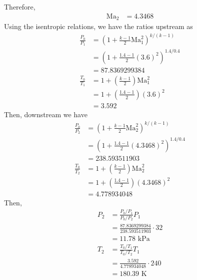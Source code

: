 Therefore,
\begin{align*}
    \text{Ma}_2 &= \boxed{4.3468}
\end{align*}
Using the isentropic relations, we have the ratios upstream as
\begin{align*}
    \frac{P_0}{P_1} &= \left(1 + \frac{k - 1}{2} \text{Ma}_1^2 \right)^{k/(k-1)} \\
    &= \left(1 + \frac{1.4 - 1}{2} (3.6)^2 \right)^{1.4/0.4} \\
    &= 87.8369299384 \\
    \frac{T_0}{T_1} &= 1 + \left( \frac{k - 1}{2} \right) \text{Ma}_1^2 \\
    &= 1 + \left( \frac{1.4 - 1}{2} \right) (3.6)^2 \\
    &= 3.592
\end{align*}
Then, downstream we have
\begin{align*}
    \frac{P_0}{P_2} &= \left(1 + \frac{k - 1}{2} \text{Ma}_2^2 \right)^{k/(k-1)} \\
    &= \left(1 + \frac{1.4 - 1}{2} (4.3468)^2 \right)^{1.4/0.4} \\
    &= 238.593511903 \\
    \frac{T_0}{T_2} &= 1 + \left( \frac{k - 1}{2} \right) \text{Ma}_2^2 \\
    &= 1 + \left( \frac{1.4 - 1}{2} \right) (4.3468)^2 \\
    &= 4.778934048
\end{align*}
Then,
\begin{align*}
    P_2 &= \frac{P_0 / P_1}{P_0 / P_2} P_1 \\
    &= \frac{87.8369299384}{238.593511903} \cdot 32 \\
    &= \boxed{11.78 \text{ kPa}} \\
    T_2 &= \frac{T_0 / T_1}{T_0 / T_2} T_1 \\
    &= \frac{3.592}{4.778934048} \cdot 240 \\
    &= \boxed{180.39 \text{ K}}
\end{align*}
